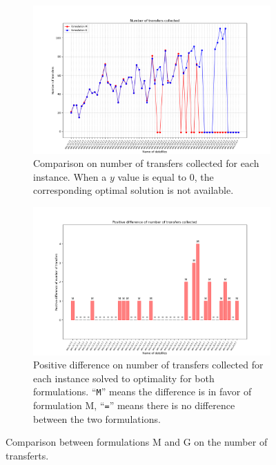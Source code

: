 \documentclass[preprint,12pt,authoryear]{elsarticle}
\begin{document}
\begin{figure}[h!]
  \begin{center}
    \begin{subfigure}{1\textwidth}
      \includegraphics[scale=0.45]{images/resultsMGnbrTft.png}
      \caption{Comparison on number of transfers  collected for each instance. When a $y$ value is equal to 0, the corresponding optimal solution is not available.}
      \label{fig:resNbrTfsMG}
    \end{subfigure}
    \begin{subfigure}{1\textwidth}
      \includegraphics[scale=0.45]{images/resultsMGdifference.png}
      \caption{Positive difference on number of transfers  collected for each instance solved to optimality for both formulations. ``\texttt{M}'' means the difference is in favor of formulation M,  ``\texttt{=}'' means there is no difference between the two formulations.}
      \label{fig:resDiffTfsMG}
    \end{subfigure}
  \end{center}
  \caption{Comparison between formulations M and G on the number of transferts.}
   \label{fig:res2MG}
\end{figure}
\end{document}
